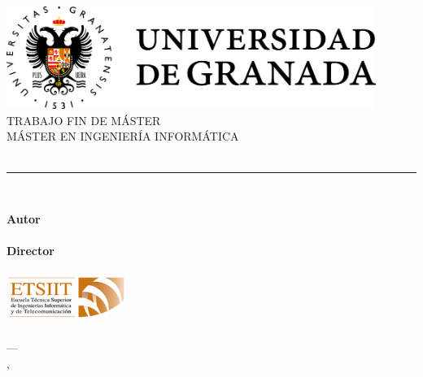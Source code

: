 \begin{titlepage}
 
\newlength{\centeroffset}
\setlength{\centeroffset}{-0.5\oddsidemargin}
\addtolength{\centeroffset}{0.5\evensidemargin}
\thispagestyle{empty}

\noindent\hspace*{\centeroffset}
\begin{minipage}{\textwidth}
\centering
\includegraphics[width=0.9\textwidth]{imagenes/misc/ugr}\\[1.4cm]
\textsc{ \Large TRABAJO FIN DE MÁSTER\\[0.2cm]}
\textsc{ MÁSTER EN INGENIERÍA INFORMÁTICA}\\[1cm]
{\Huge\bfseries \myTitle \\}
\noindent\rule[-1ex]{\textwidth}{3pt}\\[3.5ex]
{\large\bfseries \mySubtitle}
\end{minipage}

\vspace{2.5cm}

\noindent\hspace*{\centeroffset}
\begin{minipage}{\textwidth}
\centering
\textbf{Autor}\\ {\myName}\\[2.5ex]
\textbf{Director}\\ {\myProf}\\[2cm]
\includegraphics[width=0.3\textwidth]{imagenes/misc/etsiit}\\[0.1cm]
\textsc{\myFaculty}\\
\textsc{---}\\
\myLocation, \myTime
\end{minipage}

\end{titlepage}


